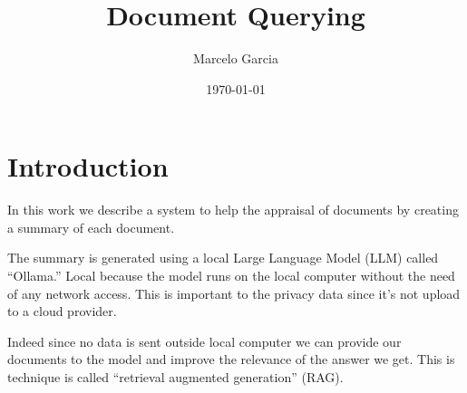 \documentclass[a4paper]{article}
\title{Document Querying}
\author{Marcelo Garcia}
\date{\today}
\begin{document}
\maketitle
\section{Introduction}
In this work we describe a system to help the appraisal of documents by creating a summary of each document.

The summary is generated using a local Large Language Model (LLM) called ``Ollama.'' Local because the model runs on the local computer without the need of any network access. This is important to the privacy data since it's not upload to a cloud provider. 

Indeed since no data is sent outside local computer we can provide our documents to the model and improve the relevance of the answer we get. This is technique is called ``retrieval augmented generation'' (RAG).
\end{document}
